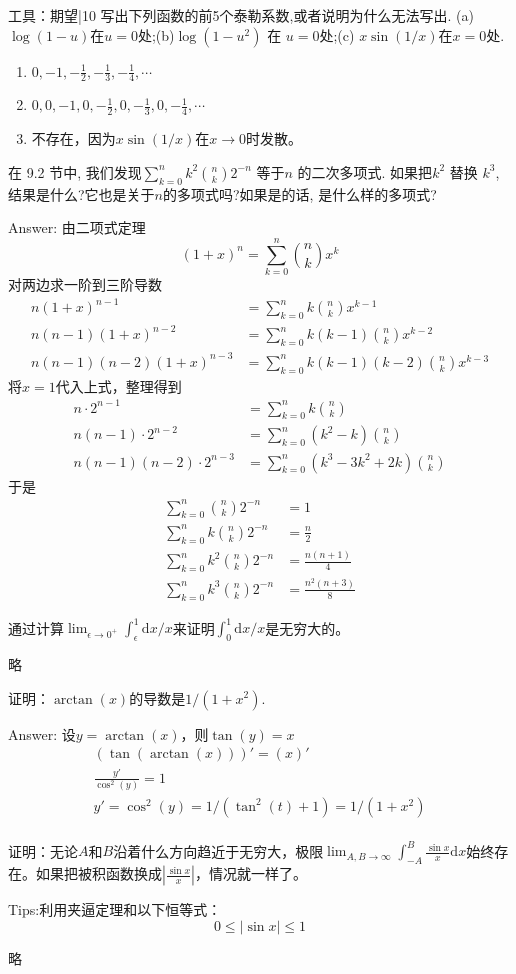 \newChapter 工具：期望|{10}
\exer 写出下列函数的前5个泰勒系数,或者说明为什么无法写出. (a)$\log(1-u)$在$u = 0$处;(b)$\log(1-u^2)$ 在 $u = 0 $处;(c) $x \sin(1/x)$在$x = 0$处.
\begin{enumerate}
\item $0,-1,-\frac{1}{2},-\frac{1}{3},-\frac{1}{4},\cdots$
\item $0,0,-1,0,-\frac{1}{2},0,-\frac{1}{3},0,-\frac{1}{4},\cdots$
\item 不存在，因为$x\sin(1/x)$在$x\to0$时发散。
\end{enumerate}

\exer 在 9.2 节中, 我们发现$\sum_{k=0}^n k^2\binom{n}{k}2^{-n}$ 等于$n$ 的二次多项式. 如果把$k^2$ 替换 $k^3$, 结果是什么?它也是关于$n$的多项式吗?如果是的话, 是什么样的多项式?\par
Answer: 由二项式定理
\[(1+x)^n=\sum_{k=0}^n\binom{n}{k}x^k\]
对两边求一阶到三阶导数
\begin{align*}
n(1+x)^{n-1}&=\sum_{k=0}^n k\binom{n}{k}x^{k-1} \\
n(n-1)(1+x)^{n-2}&=\sum_{k=0}^n k(k-1)\binom{n}{k}x^{k-2} \\
n(n-1)(n-2)(1+x)^{n-3}&=\sum_{k=0}^n k(k-1)(k-2)\binom{n}{k}x^{k-3} 
\end{align*}
将$x=1$代入上式，整理得到
\begin{align*}
n\cdot 2^{n-1}&=\sum_{k=0}^n k\binom{n}{k} \\
n(n-1)\cdot 2^{n-2}&=\sum_{k=0}^n (k^2-k)\binom{n}{k} \\
n(n-1)(n-2)\cdot 2^{n-3}&=\sum_{k=0}^n (k^3-3k^2+2k)\binom{n}{k} 
\end{align*}
于是
\begin{align*}
\sum_{k=0}^n \binom{n}{k}2^{-n} &= 1 \\
\sum_{k=0}^n k\binom{n}{k}2^{-n} &= \frac{n}{2} \\
\sum_{k=0}^n k^2\binom{n}{k}2^{-n} &= \frac{n(n+1)}{4} \\
\sum_{k=0}^n k^3\binom{n}{k}2^{-n} &= \frac{n^2(n+3)}{8} 
\end{align*}

\exer 通过计算$\lim_{\epsilon\to0^+}\int_\epsilon^1\mathrm dx/x$来证明$\int_0^1\mathrm dx/x$是无穷大的。\par
略

\exer 证明：$\arctan(x)$的导数是$1/(1+x^2)$.\par
Answer: 设$y=\arctan(x)$，则$\tan(y)=x$
\begin{gather*}
    (\tan(\arctan(x)))'=(x)'\\
    \frac{y'}{\cos^2(y)}=1\\
    y'=\cos^2(y)=1/(\tan^2(t)+1)=1/(1+x^2)\\
\end{gather*}

\exer 证明：无论$A$和$B$沿着什么方向趋近于无穷大，极限$\lim_{A,B\to\infty}\int_{-A}^B\frac{\sin x}{x}\mathrm dx$始终存在。如果把被积函数换成$|\frac{\sin x}{x}|$，情况就一样了。\par
Tips:利用夹逼定理和以下恒等式：
\[0\le |\sin x| \le 1\]

\exer 略